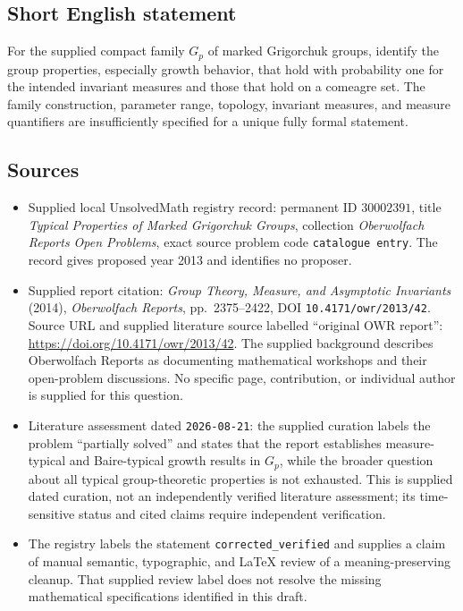 \documentclass[11pt]{article}
\begin{document}
\subsection{Short English statement}
For the supplied compact family \(G_p\) of marked Grigorchuk groups, identify the group properties, especially growth behavior, that hold with probability one for the intended invariant measures and those that hold on a comeagre set. The family construction, parameter range, topology, invariant measures, and measure quantifiers are insufficiently specified for a unique fully formal statement.
\subsection{Sources}
\begin{itemize}
\item Supplied local UnsolvedMath registry record: permanent ID \(30002391\), title \emph{Typical Properties of Marked Grigorchuk Groups}, collection \emph{Oberwolfach Reports Open Problems}, exact source problem code \texttt{catalogue entry}. The record gives proposed year 2013 and identifies no proposer.
\item Supplied report citation: \emph{Group Theory, Measure, and Asymptotic Invariants} (2014), \emph{Oberwolfach Reports}, pp.\ 2375--2422, DOI \texttt{10.4171/owr/2013/42}. Source URL and supplied literature source labelled ``original OWR report'': \url{https://doi.org/10.4171/owr/2013/42}. The supplied background describes Oberwolfach Reports as documenting mathematical workshops and their open-problem discussions. No specific page, contribution, or individual author is supplied for this question.
\item Literature assessment dated \texttt{2026-08-21}: the supplied curation labels the problem ``partially solved'' and states that the report establishes measure-typical and Baire-typical growth results in \(G_p\), while the broader question about all typical group-theoretic properties is not exhausted. This is supplied dated curation, not an independently verified literature assessment; its time-sensitive status and cited claims require independent verification.
\item The registry labels the statement \texttt{corrected\_verified} and supplies a claim of manual semantic, typographic, and LaTeX review of a meaning-preserving cleanup. That supplied review label does not resolve the missing mathematical specifications identified in this draft.
\end{itemize}
\end{document}
